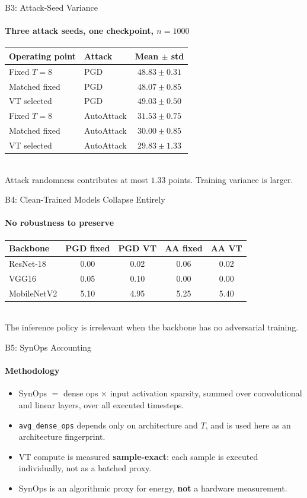 \documentclass[aspectratio=169,11pt]{beamer}
\newcommand{\FIX}[1]{\textcolor{cfixed}{#1}}
\newcommand{\VT}[1]{\textcolor{cvt}{#1}}
\begin{document}
\begin{frame}{B3: Attack-Seed Variance}\framesubtitle{Three attack seeds, one checkpoint, $n=1000$}
\centering\small
\begin{tabular}{llc}
\toprule
Operating point & Attack & Mean $\pm$ std \\
\midrule
\FIX{Fixed $T=8$}   & PGD        & $48.83 \pm 0.31$ \\
\FIX{Matched fixed} & PGD        & $48.07 \pm 0.85$ \\
\VT{VT selected}    & PGD        & $49.03 \pm 0.50$ \\
\midrule
\FIX{Fixed $T=8$}   & AutoAttack & $31.53 \pm 0.75$ \\
\FIX{Matched fixed} & AutoAttack & $30.00 \pm 0.85$ \\
\VT{VT selected}    & AutoAttack & $29.83 \pm 1.33$ \\
\bottomrule
\end{tabular}
\\\vspace{0.4em}
\small Attack randomness contributes at most $1.33$ points. Training variance is larger.
\end{frame}

\begin{frame}{B4: Clean-Trained Models Collapse Entirely}\framesubtitle{No robustness to preserve}
\centering\small
\begin{tabular}{lS[table-format=2.2]S[table-format=2.2]S[table-format=2.2]S[table-format=2.2]}
\toprule
Backbone & {PGD \FIX{fixed}} & {PGD \VT{VT}} & {AA \FIX{fixed}} & {AA \VT{VT}} \\
\midrule
ResNet-18   & 0.00 & 0.02 & 0.06 & 0.02 \\
VGG16       & 0.05 & 0.10 & 0.00 & 0.00 \\
MobileNetV2 & 5.10 & 4.95 & 5.25 & 5.40 \\
\bottomrule
\end{tabular}
\\\vspace{0.4em}
\small The inference policy is irrelevant when the backbone has no adversarial training.
\end{frame}

\begin{frame}{B5: SynOps Accounting}\framesubtitle{Methodology}
\begin{itemize}\small
  \item SynOps $=$ dense ops $\times$ input activation sparsity, summed over convolutional
        and linear layers, over all executed timesteps.
  \item \texttt{avg\_dense\_ops} depends only on architecture and $T$, and is used here as
        an architecture fingerprint.
  \item VT compute is measured \textbf{sample-exact}: each sample is executed individually,
        not as a batched proxy.
  \item SynOps is an algorithmic proxy for energy, \textbf{not} a hardware measurement.
\end{itemize}
\end{frame}
\end{document}
